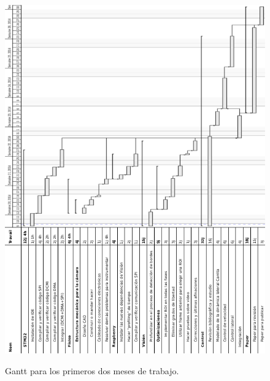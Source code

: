 \begin{figure}[ht!]
\begin{center}
\includegraphics[height=1.3\textwidth]{fig/ganttscaled}\\
\caption{Gantt para los primeros dos meses de trabajo.}
\label{fig_ganttA}
\end{center}
\end{figure}
